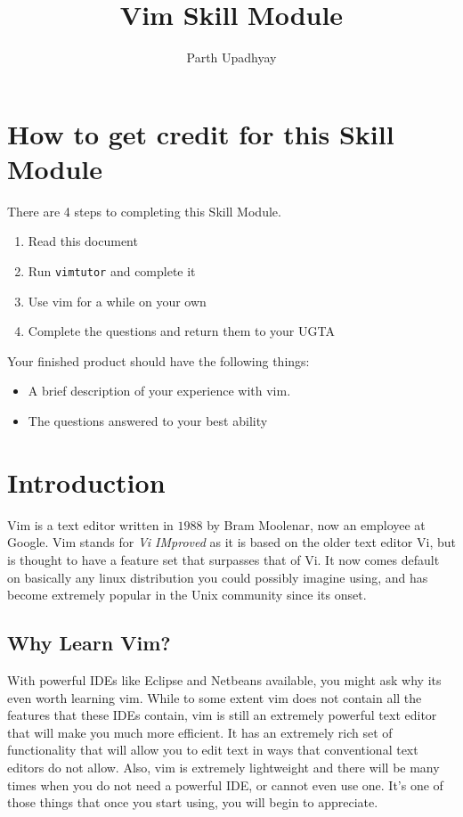 

\title{Vim Skill Module}
\author{Parth Upadhyay}
\date{}


\maketitle

\section{How to get credit for this Skill Module}
There are 4 steps to completing this Skill Module.
\begin{enumerate}
\item Read this document
\item Run \texttt{vimtutor} and complete it
\item Use vim for a while on your own
\item Complete the questions and return them to your UGTA
\end{enumerate}

\noindent
Your finished product should have the following things:
\begin{itemize}
\item A brief description of your experience with vim.
\item The questions answered to your best ability
\end{itemize}

\section{Introduction}
Vim is a text editor written in $1988$ by Bram Moolenar, now an
employee at Google. Vim stands for {\em Vi IMproved} as it is based
on the older text editor Vi, but is thought to have a feature set
that surpasses that of Vi. It now comes default on basically any
linux distribution you could possibly imagine using, and has become
extremely popular in the Unix community since its onset. 

\subsection{Why Learn Vim?}
With powerful IDEs like Eclipse and Netbeans available, you might ask why
its even worth learning vim. While to some extent vim does not contain
all the features that these IDEs contain, vim is still an 
extremely powerful text editor that will make you much more efficient.
It has an extremely rich set of functionality that will allow you to 
edit text in ways that conventional text editors do not allow. Also,
vim is extremely lightweight and there will be many times when you
do not need a powerful IDE, or cannot even use one. It's one of those
things that once you start using, you will begin to appreciate.

